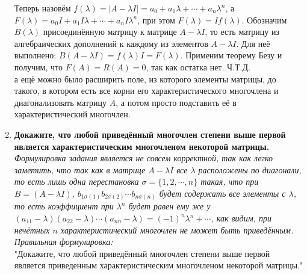 \documentclass[12pt]{article} %
\begin{document}
\begin{enumerate}
    Теперь назовём $f(\lambda) = |A - \lambda I| = a_0 + a_1 \lambda + \cdots + a_n \lambda^n$, а $F(\lambda) = a_0 I + a_1 I \lambda + \cdots + a_n I \lambda^n$, при этом $F(\lambda) = I f(\lambda)$. Обозначим $B(\lambda)$ присоединённую матрицу к матрице $A - \lambda I$, то есть матрицу из алгебраических дополнений к каждому из элементов $A - \lambda I$. Для неё выполнено: $B(A - \lambda I) = f(\lambda)I  =F(\lambda)$. Применим теорему Безу и получим, что $F(A) = R(A) = 0$, так как остатка нет. Ч.Т.Д.\\


    а ещё можно было расширить поле, из которого элементы матрицы, до такого, в котором есть все корни его характеристического многочлена и диагонализовать матрицу $A$, а потом просто подставить её в характеристический многочлен.
    \item \textbf{Докажите, что любой приведённый многочлен степени выше первой является характеристическим многочленом некоторой матрицы.}\\

    \textit{Формулировка задания является не совсем корректной, так как легко заметить, что так как в матрице $A - \lambda I$ все $\lambda$ расположены по диагонали, то есть лишь одна перестановка $\sigma = \{1, 2 , \cdots, n\}$ такая, что при  $B = (A - \lambda I)$, $b_{1\sigma(1)}b_{2\sigma(2)} \cdots b_{n\sigma(n)}$ будет содержать все элементы с $\lambda$, то есть коэффициент при $\lambda^n$ будет равен ему же у $(a_{11} - \lambda)(a_{22} - \lambda)\cdots(a_{nn} - \lambda) = (-1)^n\lambda^n + \cdots$, как видим, при нечётных $n$ характеристический многочлен не может быть приведённым. Правильная формулировка:}\\

    "Докажите, что любой приведённый многочлен степени выше первой является приведенным характеристическим многочленом некоторой матрицы."


\end{enumerate}
\end{document}
